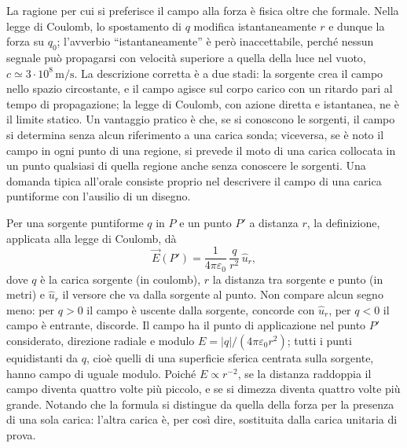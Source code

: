 \documentclass[11pt,a4paper]{article}
\newcommand{\epz}{\varepsilon_0}
\newcommand{\Ev}{\vec{E}}
\newcommand{\uv}{\hat{u}}
\begin{document}
La ragione per cui si preferisce il campo alla forza è fisica oltre che formale. Nella legge di Coulomb, lo spostamento di $q$ modifica istantaneamente $r$ e dunque la forza su $q_0$; l'avverbio ``istantaneamente'' è però inaccettabile, perché nessun segnale può propagarsi con velocità superiore a quella della luce nel vuoto, $c\simeq\ensuremath{3\cdot 10^{8}\,\mathrm{m/s}}$. La descrizione corretta è a due stadi: la sorgente crea il campo nello spazio circostante, e il campo agisce sul corpo carico con un ritardo pari al tempo di propagazione; la legge di Coulomb, con azione diretta e istantanea, ne è il limite statico. Un vantaggio pratico è che, se si conoscono le sorgenti, il campo si determina senza alcun riferimento a una carica sonda; viceversa, se è noto il campo in ogni punto di una regione, si prevede il moto di una carica collocata in un punto qualsiasi di quella regione anche senza conoscere le sorgenti. Una domanda tipica all'orale consiste proprio nel descrivere il campo di una carica puntiforme con l'ausilio di un disegno.

Per una sorgente puntiforme $q$ in $P$ e un punto $P'$ a distanza $r$, la definizione, applicata alla legge di Coulomb, dà
\[
\Ev(P')=\frac{1}{4\pi\epz}\,\frac{q}{r^2}\,\uv_r ,
\]
dove $q$ è la carica sorgente (in coulomb), $r$ la distanza tra sorgente e punto (in metri) e $\uv_r$ il versore che va dalla sorgente al punto. Non compare alcun segno meno: per $q>0$ il campo è uscente dalla sorgente, concorde con $\uv_r$, per $q<0$ il campo è entrante, discorde. Il campo ha il punto di applicazione nel punto $P'$ considerato, direzione radiale e modulo $E=|q|/(4\pi\epz r^2)$; tutti i punti equidistanti da $q$, cioè quelli di una superficie sferica centrata sulla sorgente, hanno campo di uguale modulo. Poiché $E\propto r^{-2}$, se la distanza raddoppia il campo diventa quattro volte più piccolo, e se si dimezza diventa quattro volte più grande. Notando che la formula si distingue da quella della forza per la presenza di una sola carica: l'altra carica è, per così dire, sostituita dalla carica unitaria di prova.
\end{document}
